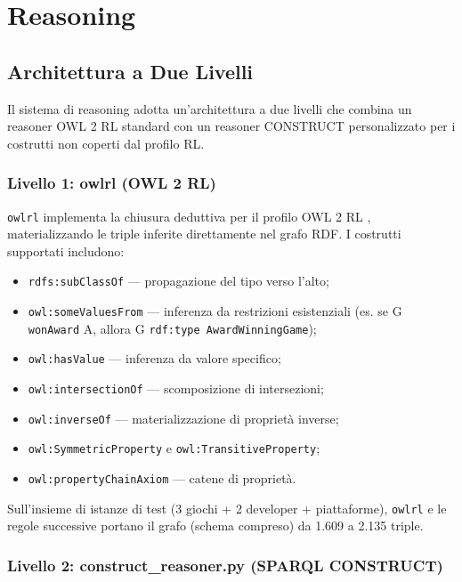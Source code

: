 \section{Reasoning}
\label{sec:reasoning}

\subsection{Architettura a Due Livelli}

Il sistema di reasoning adotta un'architettura a due livelli che combina un
reasoner OWL 2 RL standard con un reasoner CONSTRUCT personalizzato per i
costrutti non coperti dal profilo RL.

\subsubsection{Livello 1: owlrl (OWL 2 RL)}

\texttt{owlrl} \citep{owlrl} implementa la chiusura deduttiva per il profilo
OWL 2 RL \citep{w3c-owl2-rl}, materializzando le triple inferite direttamente
nel grafo RDF. I costrutti supportati includono:
\begin{itemize}[nosep]
  \item \texttt{rdfs:subClassOf} --- propagazione del tipo verso l'alto;
  \item \texttt{owl:someValuesFrom} --- inferenza da restrizioni esistenziali
    (es. se G \texttt{wonAward} A, allora G \texttt{rdf:type AwardWinningGame});
  \item \texttt{owl:hasValue} --- inferenza da valore specifico;
  \item \texttt{owl:intersectionOf} --- scomposizione di intersezioni;
  \item \texttt{owl:inverseOf} --- materializzazione di propriet\`a inverse;
  \item \texttt{owl:SymmetricProperty} e \texttt{owl:TransitiveProperty};
  \item \texttt{owl:propertyChainAxiom} --- catene di propriet\`a.
\end{itemize}

Sull'insieme di istanze di test (3 giochi + 2 developer + piattaforme), \texttt{owlrl} e le regole successive portano
il grafo (schema compreso) da 1.609 a 2.135 triple.

\subsubsection{Livello 2: construct\_reasoner.py (SPARQL CONSTRUCT)}

